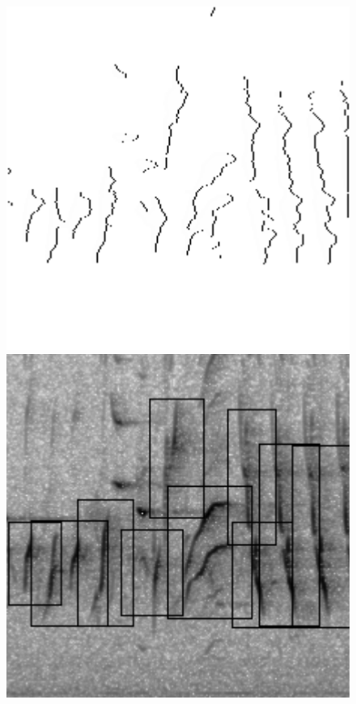 \documentclass[t, xcolor={dvipsnames}]{beamer}
\begin{document}
\begin{frame}[fragile]
\begin{figure}[!tbp]
\begin{minipage}[c]{0.3\textwidth}
        \includegraphics[width=\textwidth]{img/contours}
      \end{minipage}
      \hfill
      \begin{minipage}[c]{0.3\textwidth}
        \includegraphics[width=\textwidth]{img/detected-features}
      \end{minipage}
    \end{figure}
\end{frame}
\end{document}
